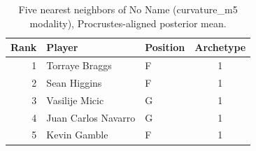 \begin{table}[htbp]
  \centering\small
  \begin{tabular}{rllc}
    \toprule
    Rank & Player & Position & Archetype \\
    \midrule
    1 & Torraye Braggs & F & 1 \\
    2 & Sean Higgins & F & 1 \\
    3 & Vasilije Micic & G & 1 \\
    4 & Juan Carlos Navarro & G & 1 \\
    5 & Kevin Gamble & F & 1 \\
    \bottomrule
  \end{tabular}
  \caption{Five nearest neighbors of No Name (curvature_m5 modality), Procrustes-aligned posterior mean.}
  \label{tab:No_Name_neighbors_curvature_m5}
\end{table}

